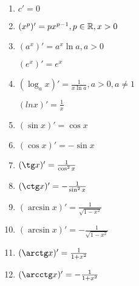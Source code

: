 \begin{enumerate}
    \item $c' = 0$
    \item  $(x^p)' = p x^{p-1}, p \in \mathbb{R}, x > 0$
    \item $(a^x)' = a^x \ln a, a > 0$

        $(e^x)' = e^x$
    \item  $(\log_a x)' = \frac{1}{x \ln a}, a > 0, a \neq 1$ 

        $(ln x)' = \frac{1}{x}$ 
    \item $(\sin x)' = \cos x$
    \item  $(\cos x)' = -\sin x$
    \item  $(\tg x)' = \frac{1}{\cos^2 x}$
    \item $(\ctg x)' = -\frac{1}{\sin^2 x}$
    \item $(\arcsin x)' = \frac{1}{\sqrt{1-x^2}}$ 
    \item $(\arcsin x)' = -\frac{1}{\sqrt{1-x^2}}$ 
    \item $(\arctg x)' = \frac{1}{1 + x^2}$ 
    \item $(\arcctg x)' = -\frac{1}{1+x^2}$
\end{enumerate}
